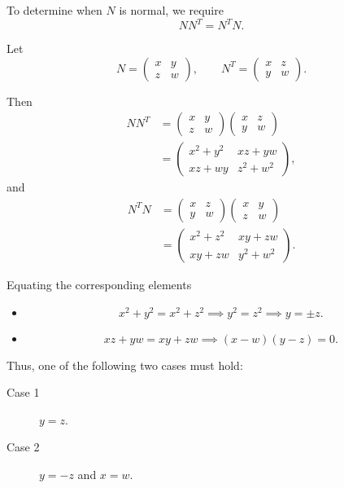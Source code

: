 \documentclass[11pt, reqno, a4paper]{amsart}
\theoremstyle{plain}
\theoremstyle{definition}
\theoremstyle{remark}
\numberwithin{equation}{section}
\begin{document}
To determine when $N$ is normal, we require
\[
NN^T=N^TN.
\]

Let
\[
N=
\begin{pmatrix}
x&y\\
z&w
\end{pmatrix},
\qquad
N^T=
\begin{pmatrix}
x&z\\
y&w
\end{pmatrix}.
\]

Then
\begin{align*}
NN^T
&=
\begin{pmatrix}
x&y\\
z&w
\end{pmatrix}
\begin{pmatrix}
x&z\\
y&w
\end{pmatrix}\\
&=
\begin{pmatrix}
x^2+y^2&xz+yw\\
xz+wy&z^2+w^2
\end{pmatrix},
\end{align*}
and
\begin{align*}
N^TN
&=
\begin{pmatrix}
x&z\\
y&w
\end{pmatrix}
\begin{pmatrix}
x&y\\
z&w
\end{pmatrix}\\
&=
\begin{pmatrix}
x^2+z^2&xy+zw\\
xy+zw&y^2+w^2
\end{pmatrix}.
\end{align*}

Equating the corresponding elements
\begin{itemize}
    \item
    \[
    x^2+y^2=x^2+z^2
    \implies y^2=z^2
    \implies y=\pm z.
    \]

    \item
    \[
    xz+yw=xy+zw
    \implies (x-w)(y-z)=0.
    \]
\end{itemize}

Thus, one of the following two cases must hold:
\begin{description}
    \item[Case 1] $y=z$.
    \item[Case 2] $y=-z$ and $x=w$.
\end{description}
\end{document}
